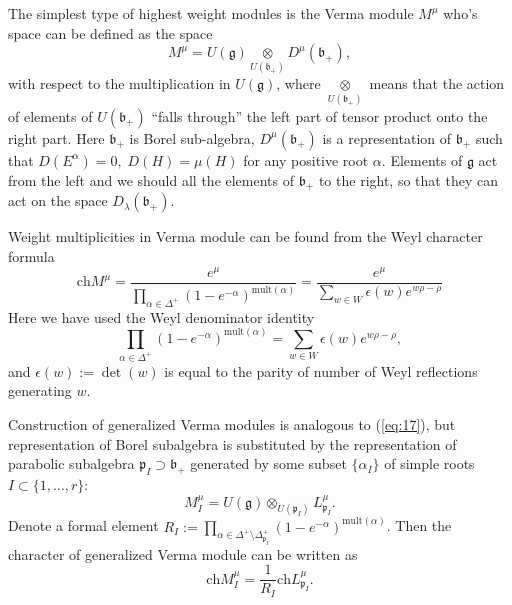 \documentclass[preprint,12pt]{elsarticle}
\newcommand{\gf}{\mathfrak{g}}
\newcommand{\bff}{\mathfrak{b}}
\newcommand{\pf}{\mathfrak{p}}
\begin{document}
The simplest type of highest weight modules is the Verma module
$M^{\mu}$ who's space can be defined as the space
\begin{equation}
  \label{eq:17}
  M^{\mu}=U(\gf)\underset{U(\bff_{+})}{\otimes} D^{\mu}(\bff_{+}),
\end{equation}
with respect to the multiplication in $U(\gf)$,
where $\underset{U(\bff_{+})}{\otimes}$ means that the action of elements of $U(\bff_{+})$ ``falls through'' the left part of tensor product onto the right part. Here $\bff_{+}$ is Borel sub-algebra, $D^{\mu}(\bff_{+})$ is a representation of $\bff_{+}$ such that $D(E^{\alpha})=0,\; D(H)=\mu(H)$ for any positive root $\alpha$.
Elements of $\gf$ act from the left and we should all the elements of $\bff_{+}$ to the right, so that they can act on the space $D_{\lambda}(\bff_{+})$.

Weight multiplicities in Verma module can be found from the Weyl
character formula
\begin{equation}
  \label{eq:11}
  \mathrm{ch} M^{\mu}=\frac{e^{\mu}}{\prod_{\alpha\in \Delta^{+}} \left( 1-e^{-\alpha}\right)^{\mathrm{mult}(\alpha)}}=\frac{e^{\mu}}{\sum_{w\in W} \epsilon(w) e^{w\rho-\rho}}
\end{equation}
Here we have used the Weyl denominator identity
\begin{equation}
  \label{eq:12}
  \prod_{\alpha\in \Delta^{+}} \left( 1-e^{-\alpha}\right)^{\mathrm{mult}(\alpha)}=\sum_{w\in W} \epsilon(w) e^{w\rho-\rho},
\end{equation}
and $\epsilon \left( w\right) :=\det \left( w\right)$ is equal to
the parity of number of Weyl reflections generating $w$.

Construction of generalized Verma modules is analogous to (\ref{eq:17}), but representation of Borel subalgebra is substituted by the representation of parabolic subalgebra $\pf_{I}\supset \bff_{+}$ generated by some subset $\{\alpha_{I}\}$ of simple roots $I\subset \{1,\dots, r\}$:
\begin{equation*}
M_{I}^{\mu}=U\left( \gf\right)\otimes _{U\left( \pf_{I}\right) }L_{\pf_{I}}^{\mu}.
\end{equation*}
Denote a formal element $R_{I}:=\prod_{\alpha \in \Delta
^{+}\setminus \Delta _{\pf_{I}}^{+}}\left( 1-e^{-\alpha }\right)
^{\mathrm{mult}(\alpha )}$. Then the character of generalized
Verma module can be written as
\begin{equation}
  \label{eq:18}
  \mathrm{ch}M_{I}^{\mu}=\frac{1}{R_{I}}\mathrm{ch}L_{\pf_{I}}^{\mu }.
\end{equation}
\end{document}
